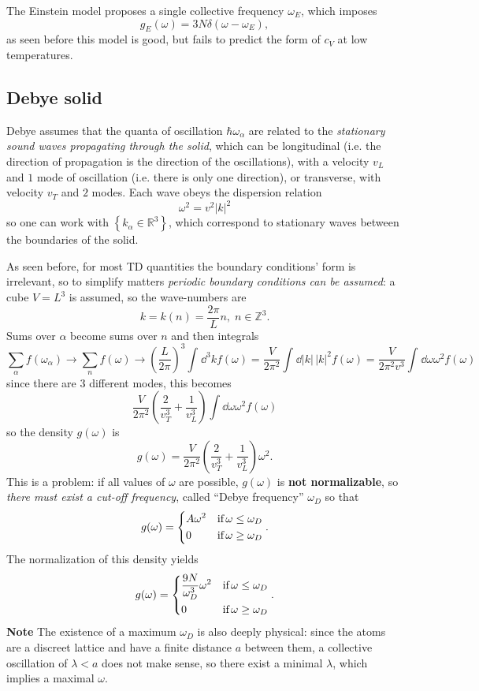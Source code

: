 The Einstein model proposes a single collective frequency $\omega_E$, which
imposes
\[
    g_E(\omega)=3N\delta(\omega-\omega_E),
\]
as seen before this model is good, but fails to predict the form of $c_V$ at low
temperatures.
\subsection{Debye solid}
Debye assumes that the quanta of oscillation $\hbar\omega_\alpha$ are related
to the \textit{stationary sound waves propagating through the solid}, which
can be longitudinal (i.e. the direction of propagation is the direction of the
oscillations), with a velocity $v_L$ and $1$ mode of oscillation (i.e. there is
only one direction),
or transverse, with velocity $v_T$ and $2$ modes. Each wave obeys the dispersion
relation
\[
    \omega^2=v^2|k|^2
\]
so one can work with $\left\{k_\alpha\in\mathbb{R}^3\right\}$, which correspond
to stationary waves between the boundaries of the solid.

As seen before, for most TD quantities the boundary conditions' form is
irrelevant, so to simplify matters \textit{periodic boundary conditions can be 
assumed}: a cube $V=L^3$ is assumed, so the wave-numbers are
\[
    k=k(n)=\frac{2\pi}{L}n,\; n\in\mathbb{Z}^3.
\]
Sums over $\alpha$ become sums over $n$ and then integrals
\[
    \sum_{\alpha}^{} f(\omega_\alpha)\to\sum_{n}^{} f(\omega)\to
    \left(\frac{L}{2\pi}\right)^3\int_{}^{} \dd^3k f(\omega)=
    \frac{V}{2\pi^2}\int_{}^{} \dd |k|\,|k|^2f(\omega)=\frac{V}{2\pi^2v^3}
    \int_{}^{} \dd\omega \omega^2f(\omega)
\]
since there are $3$ different modes, this becomes
\[
    \frac{V}{2\pi^2}\left(\frac{2}{v_T^3}+\frac{1}{v_L^3}\right)\int\dd \omega
    \omega^2 f(\omega)
\]
so the density $g(\omega)$ is
\[
    g(\omega)=\frac{V}{2\pi^2}\left(\frac{2}{v_T^3}+\frac{1}{v_L^3}\right)
    \omega^2.
\]
This is a problem: if all values of $\omega$ are possible, $g(\omega)$ is
\textbf{not normalizable}, so \textit{there must exist a cut-off frequency},
called ``Debye frequency'' $\omega_D$ so that
\[
    g(\omega)=\begin{dcases}
        A\omega^2&\text{if}\,\omega\leq \omega_D\\
        0&\text{if}\,\omega\geq \omega_D
    \end{dcases}.
\]
The normalization of this density yields
\[
    g(\omega)=\begin{dcases}
        \frac{9N}{\omega_D^3}\omega^2&\text{if}\,\omega\leq \omega_D\\
        0&\text{if}\,\omega\geq \omega_D
    \end{dcases}.
\]
\textbf{Note} The existence of a maximum $\omega_D$ is also deeply physical:
since the atoms are a discreet lattice and have a finite distance $a$ between
them, a collective oscillation of $\lambda<a$ does not make sense, so
there exist a minimal $\lambda$, which implies a maximal $\omega$.

